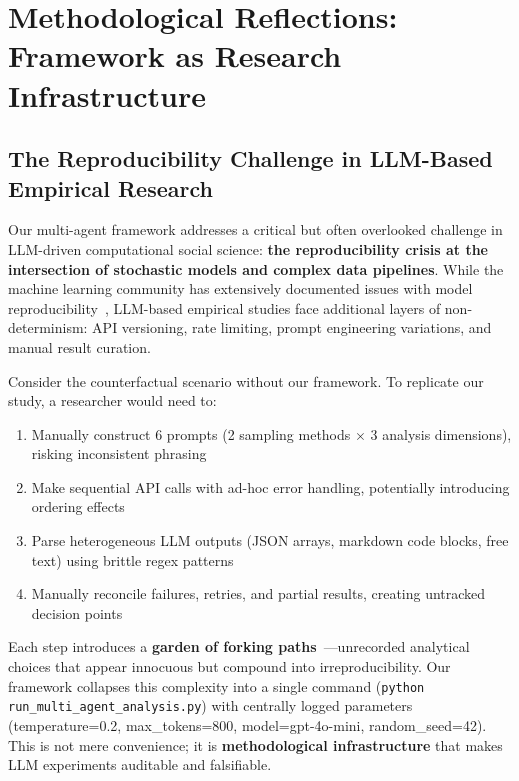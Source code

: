 \section{Methodological Reflections: Framework as Research Infrastructure}\label{sec:framework-role}

\subsection{The Reproducibility Challenge in LLM-Based Empirical Research}

Our multi-agent framework addresses a critical but often overlooked challenge in LLM-driven computational social science: \textbf{the reproducibility crisis at the intersection of stochastic models and complex data pipelines}. While the machine learning community has extensively documented issues with model reproducibility~\cite{gundersen2018state}, LLM-based empirical studies face additional layers of non-determinism: API versioning, rate limiting, prompt engineering variations, and manual result curation. 

Consider the counterfactual scenario without our framework. To replicate our study, a researcher would need to:
\begin{enumerate}
    \item Manually construct 6 prompts (2 sampling methods $\times$ 3 analysis dimensions), risking inconsistent phrasing
    \item Make sequential API calls with ad-hoc error handling, potentially introducing ordering effects
    \item Parse heterogeneous LLM outputs (JSON arrays, markdown code blocks, free text) using brittle regex patterns
    \item Manually reconcile failures, retries, and partial results, creating untracked decision points
\end{enumerate}

Each step introduces a \textbf{garden of forking paths}~\cite{gelman2013garden}---unrecorded analytical choices that appear innocuous but compound into irreproducibility. Our framework collapses this complexity into a single command (\texttt{python run\_multi\_agent\_analysis.py}) with centrally logged parameters (temperature=0.2, max\_tokens=800, model=gpt-4o-mini, random\_seed=42). This is not mere convenience; it is \textbf{methodological infrastructure} that makes LLM experiments auditable and falsifiable.


